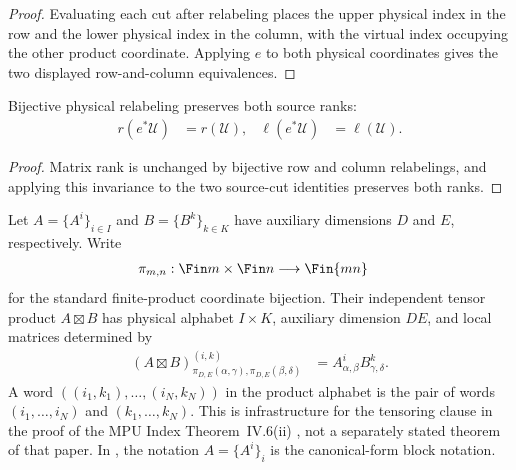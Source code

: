 \begin{proof}\leanok
    Evaluating each cut after relabeling places the upper physical index
    in the row and the lower physical index in the column, with the
    virtual index occupying the other product coordinate. Applying $e$ to both
    physical coordinates gives the two displayed row-and-column equivalences.
\end{proof}

\begin{lemma}
    \label{thm:mpu_source_ranks_physical_reindexing}
    \leanok
    Bijective physical relabeling preserves both source ranks:
    \begin{align}
        r(e^*\mathcal U) & =r(\mathcal U),
                         & \ell(e^*\mathcal U) & =\ell(\mathcal U).
    \end{align}
\end{lemma}

\begin{proof}\leanok
    Matrix rank is unchanged by bijective row and column relabelings, and applying this
    invariance to the two source-cut identities preserves both ranks.
\end{proof}

\begin{definition}
    \label{def:mps_independent_tensor_product}
    \leanok
    Let $A=\{A^i\}_{i\in I}$ and $B=\{B^k\}_{k\in K}$ have
    auxiliary dimensions $D$ and $E$, respectively.  Write
    \begin{align}
        \pi_{m,n}:\Fin m\times\Fin n & \longrightarrow\Fin{mn}
    \end{align}
    for the standard finite-product coordinate bijection.  Their independent
    tensor product $A\boxtimes B$ has physical alphabet $I\times K$, auxiliary
    dimension $DE$, and local matrices determined by
    \begin{align}
        (A\boxtimes B)^{(i,k)}_{
                \pi_{D,E}(\alpha,\gamma),\pi_{D,E}(\beta,\delta)}
         & =A^i_{\alpha,\beta}B^k_{\gamma,\delta}.
        \label{eq:mps_independent_tensor_product_entries}
    \end{align}
    A word $((i_1,k_1),\dots,(i_N,k_N))$ in the product alphabet is the pair
    of words $(i_1,\dots,i_N)$ and $(k_1,\dots,k_N)$.
    This is infrastructure for the tensoring clause in the proof of the MPU
    Index Theorem~IV.6(ii)
    \cite[lines~824--845]{Cirac2017MPU}, not a separately stated theorem of
    that paper.  In \cite[Section~2.3, lines~214--245]{Cirac2016MPDO_arXiv}, the notation $A=\{A^i\}_i$ is the canonical-form block
    notation.
\end{definition}

